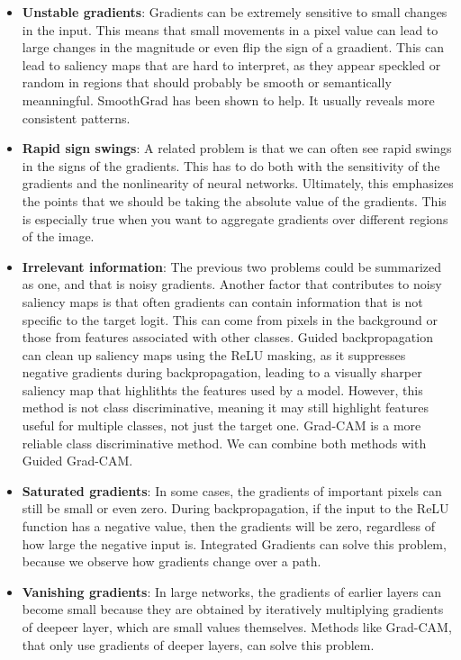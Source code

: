 \begin{itemize}
\item \textbf{Unstable gradients}: Gradients can be extremely sensitive to small changes in the input. This means that small movements in a pixel value can lead to large changes in the magnitude or even flip the sign of a graadient. This can lead to saliency maps that are hard to interpret, as they appear speckled or random in regions that should probably be smooth or semantically meanningful. SmoothGrad has been shown to help. It usually reveals more consistent patterns.

\item \textbf{Rapid sign swings}: A related problem is that we can often see rapid swings in the signs of the gradients. This has to do both with the sensitivity of the gradients and the nonlinearity of neural networks. Ultimately, this emphasizes the points that we should be taking the absolute value of the gradients. This is especially true when you want to aggregate gradients over different regions of the image.

\item \textbf{Irrelevant information}: The previous two problems could be summarized as one, and that is noisy gradients. Another factor that contributes to noisy saliency maps is that often gradients can contain information that is not specific to the target logit. This can come from pixels in the background or those from features associated with other classes. Guided backpropagation can clean up saliency maps using the ReLU masking, as it suppresses negative gradients during backpropagation, leading to a visually sharper saliency map that highlithts the features used by a model. However, this method is not class discriminative, meaning it may still highlight features useful for multiple classes, not just the target one. Grad-CAM is a more reliable class discriminative method. We can combine both methods with Guided Grad-CAM.

\item \textbf{Saturated gradients}: In some cases, the gradients of important pixels can still be small or even zero. During backpropagation, if the input to the ReLU function has a negative value, then the gradients will be zero, regardless of how large the negative input is. Integrated Gradients can solve this problem, because we observe how gradients change over a path.

\item \textbf{Vanishing gradients}: In large networks, the gradients of earlier layers can become small because they are obtained by iteratively multiplying gradients of deepeer layer, which are small values themselves. Methods like Grad-CAM, that only use gradients of deeper layers, can solve this problem.


\end{itemize}
